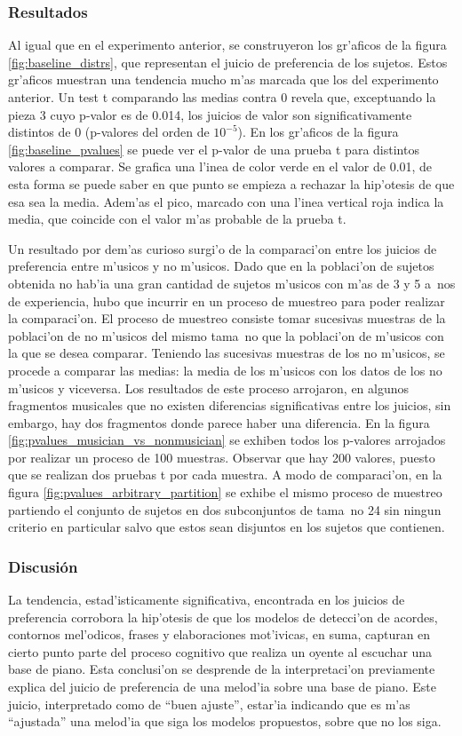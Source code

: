 \subsubsection{Resultados}
Al igual que en el experimento anterior, se construyeron los gr'aficos de la figura \ref{fig:baseline_distrs}, que representan el 
juicio de preferencia de los sujetos. Estos gr'aficos muestran una tendencia mucho m'as marcada que los del experimento anterior.
 Un test t comparando las medias contra 0 revela que, exceptuando la pieza 3 
cuyo p-valor es de 0.014, los juicios de valor son significativamente distintos de 0 (p-valores del orden de $10^{-5}$). En los gr'aficos de la figura \ref{fig:baseline_pvalues} se puede ver el p-valor de una prueba t para distintos valores a comparar. Se grafica una l'inea de color verde en el valor de 0.01, de esta forma se puede saber en que punto se empieza a rechazar la hip'otesis de que esa sea la media. Adem'as el pico, marcado con una l'inea
vertical roja indica la media, que coincide con el valor m'as probable de la prueba t.

Un resultado por dem'as curioso surgi'o de la comparaci'on entre los juicios de preferencia entre m'usicos y no m'usicos. Dado que en la poblaci'on 
de sujetos obtenida no hab'ia una gran cantidad de sujetos m'usicos con m'as de 3 y 5 a~nos de experiencia, hubo que incurrir en un proceso de muestreo
para poder realizar la comparaci'on. El proceso de muestreo consiste tomar sucesivas muestras de la poblaci'on de no m'usicos del mismo tama~no que la 
poblaci'on de m'usicos con la que se desea comparar. Teniendo las sucesivas muestras de los no m'usicos, se procede a comparar las medias: la media de los
m'usicos con los datos de los no m'usicos y viceversa. Los resultados de este proceso arrojaron, en algunos fragmentos musicales que no existen diferencias
significativas entre los juicios, sin embargo, hay dos fragmentos donde parece haber una diferencia. En la figura \ref{fig:pvalues_musician_vs_nonmusician}
se exhiben todos los p-valores arrojados por realizar un proceso de 100 muestras. Observar que hay 200 valores, puesto que se realizan dos pruebas t por 
cada muestra. A modo de comparaci'on, en la figura \ref{fig:pvalues_arbitrary_partition} se exhibe el mismo proceso de muestreo partiendo el conjunto 
de sujetos en dos subconjuntos de tama~no 24 sin ningun criterio en particular salvo que estos sean disjuntos en los sujetos que contienen.

\subsubsection{Discusi\'on}
La tendencia, estad'isticamente significativa, encontrada en los juicios de preferencia corrobora la hip'otesis de que los modelos de detecci'on de 
acordes, contornos mel'odicos, frases y elaboraciones mot'ivicas, en suma, capturan en cierto punto parte del proceso cognitivo que realiza un oyente al
escuchar una base de piano. Esta conclusi'on se desprende de la interpretaci'on previamente explica del juicio de preferencia de una melod'ia sobre
una base de piano. Este juicio, interpretado como de ``buen ajuste'', estar'ia indicando que es m'as ``ajustada'' una melod'ia que siga los modelos 
propuestos, sobre que no los siga.

